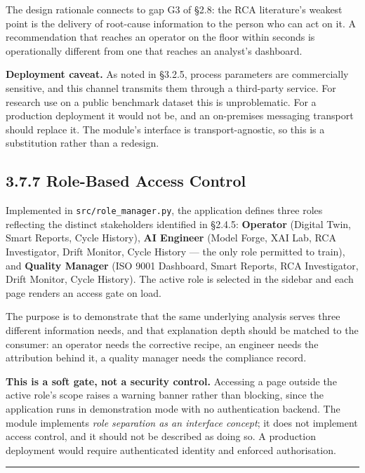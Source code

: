 The design rationale connects to gap G3 of §2.8: the RCA literature's weakest point is the delivery of root-cause information to the person who can act on it. A recommendation that reaches an operator on the floor within seconds is operationally different from one that reaches an analyst's dashboard.

\textbf{Deployment caveat.} As noted in §3.2.5, process parameters are commercially sensitive, and this channel transmits them through a third-party service. For research use on a public benchmark dataset this is unproblematic. For a production deployment it would not be, and an on-premises messaging transport should replace it. The module's interface is transport-agnostic, so this is a substitution rather than a redesign.

\hypertarget{role-based-access-control}{%
\subsection{3.7.7 Role-Based Access Control}\label{role-based-access-control}}

Implemented in \texttt{src/role\_manager.py}, the application defines three roles reflecting the distinct stakeholders identified in §2.4.5: \textbf{Operator} (Digital Twin, Smart Reports, Cycle History), \textbf{AI Engineer} (Model Forge, XAI Lab, RCA Investigator, Drift Monitor, Cycle History --- the only role permitted to train), and \textbf{Quality Manager} (ISO 9001 Dashboard, Smart Reports, RCA Investigator, Drift Monitor, Cycle History). The active role is selected in the sidebar and each page renders an access gate on load.

The purpose is to demonstrate that the same underlying analysis serves three different information needs, and that explanation depth should be matched to the consumer: an operator needs the corrective recipe, an engineer needs the attribution behind it, a quality manager needs the compliance record.

\textbf{This is a soft gate, not a security control.} Accessing a page outside the active role's scope raises a warning banner rather than blocking, since the application runs in demonstration mode with no authentication backend. The module implements \emph{role separation as an interface concept}; it does not implement access control, and it should not be described as doing so. A production deployment would require authenticated identity and enforced authorisation.

\begin{center}\rule{0.5\linewidth}{0.5pt}\end{center}

